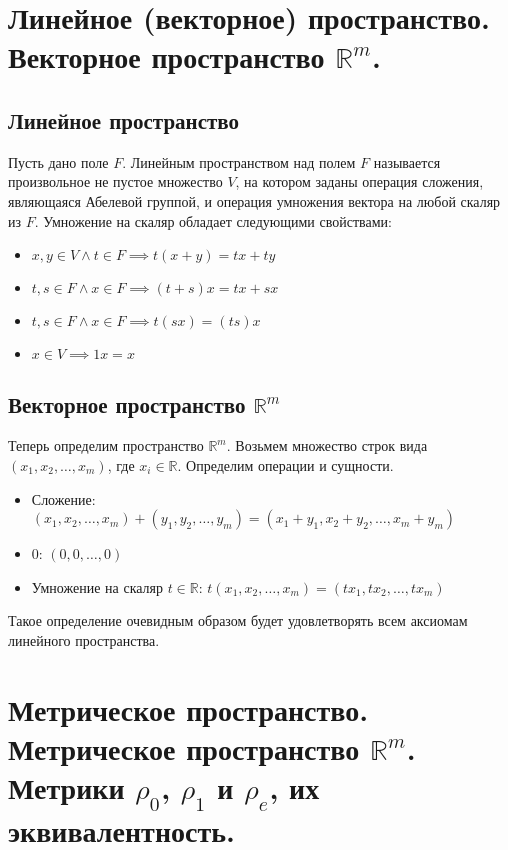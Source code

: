 \section{Линейное (векторное) пространство. Векторное пространство $\mathbb{R}^m$.}
\subsection{Линейное пространство}
Пусть дано поле $F$. Линейным пространством над полем $F$ называется произвольное не пустое множество $V$, на котором заданы операция сложения, являющаяся Абелевой группой, и операция умножения вектора на любой скаляр из $F$. Умножение на скаляр обладает следующими свойствами:
\begin{itemize}
    \item $x, y \in V \land t \in F \implies t(x + y) = tx + ty$
    \item $t, s \in F \land x \in F \implies (t + s)x = tx + sx$
    \item $t, s \in F \land x \in F \implies t(sx) = (ts)x$
    \item $x \in V \implies 1x = x$
\end{itemize}
\subsection{Векторное пространство $\mathbb{R}^m$}
Теперь определим пространство $\mathbb{R}^m$. Возьмем множество строк вида $(x_1, x_2, \dots, x_m)$, где $x_i \in \mathbb{R}$. Определим операции и сущности. 
\begin{itemize}
    \item Сложение: $(x_1, x_2, \dots, x_m) + (y_1, y_2, \dots, y_m) = (x_1 + y_1, x_2 + y_2, \dots, x_m + y_m)$
    \item $0$: $(0, 0, \dots, 0)$
    \item Умножение на скаляр $t \in \mathbb{R}$: $t(x_1, x_2, \dots, x_m) = (tx_1, tx_2, \dots, tx_m)$
\end{itemize} 
Такое определение очевидным образом будет удовлетворять всем аксиомам линейного пространства.

\section{Метрическое пространство. Метрическое пространство $\mathbb{R}^m$. Метрики $\rho_0$, $\rho_1$ и $\rho_e$, их эквивалентность.}
